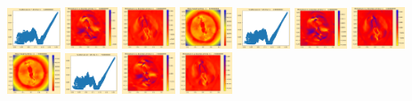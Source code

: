 \documentclass[11pt]{article}
\begin{document}
\includegraphics[width=0.11875\textwidth]{frame0068fig1.png}
\includegraphics[width=0.11875\textwidth]{frame0068fig2.png}
\includegraphics[width=0.11875\textwidth]{frame0068fig3.png}
\includegraphics[width=0.11875\textwidth]{frame0069fig0.png}
\includegraphics[width=0.11875\textwidth]{frame0069fig1.png}
\includegraphics[width=0.11875\textwidth]{frame0069fig2.png}
\includegraphics[width=0.11875\textwidth]{frame0069fig3.png}
\vskip 10pt 
\includegraphics[width=0.11875\textwidth]{frame0070fig0.png}
\includegraphics[width=0.11875\textwidth]{frame0070fig1.png}
\includegraphics[width=0.11875\textwidth]{frame0070fig2.png}
\includegraphics[width=0.11875\textwidth]{frame0070fig3.png}
\end{document}
